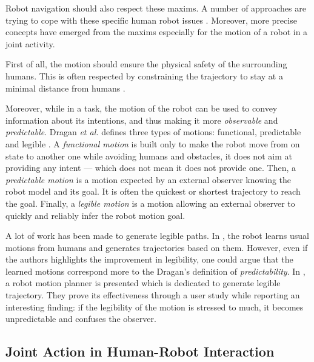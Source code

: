 \documentclass[a4paper,11pt,twoside]{StyleThese}
\begin{document}
Robot navigation should also respect these maxims. A number of approaches are trying to cope with these specific human robot issues \cite{kruse_human-aware_2013}. Moreover, more precise concepts have emerged from the maxims especially for the motion of a robot in a joint activity. 

First of all, the motion should ensure the physical safety of the surrounding humans. This is often respected by constraining the trajectory to stay at a minimal distance from humans \cite{kruse_human-aware_2013, rios2015proxemics}. 

Moreover, while in a task, the motion of the robot can be used to convey information about its intentions, and thus making it more \textit{observable} and \textit{predictable}. Dragan \textit{et al.} defines three types of motions: functional, predictable and legible \cite{dragan2015effects}. A \textit{functional motion} is built only to make the robot move from on state to another one while avoiding humans and obstacles, it does not aim at providing any intent --- which does not mean it does not provide one. Then, a \textit{predictable motion} is a motion expected by an external observer knowing the robot model and its goal. It is often the quickest or shortest trajectory to reach the goal. Finally, a \textit{legible motion} is a motion allowing an external observer to quickly and reliably infer the robot motion goal.

A lot of work has been made to generate legible paths. In \cite{beetz2010generality}, the robot learns usual motions from humans and generates trajectories based on them. However, even if the authors highlights the improvement in legibility, one could argue that the learned motions correspond more to the Dragan's definition of \textit{predictability}. In \cite{dragan_legibility_2013}, a robot motion planner is presented which is dedicated to generate legible trajectory. They prove its effectiveness through a user study while reporting an interesting finding: if the legibility of the motion is stressed to much, it becomes unpredictable and confuses the observer.




\subsection{Joint Action in Human-Robot Interaction}
\end{document}
